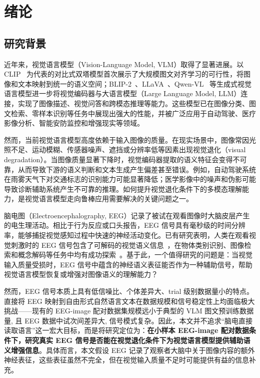 \section{绪论}

\subsection{研究背景}

近年来，视觉语言模型（Vision-Language Model, VLM）取得了显著进展。以 CLIP~\cite{radford2021learning} 为代表的对比式双塔模型首次展示了大规模图文对齐学习的可行性，将图像和文本映射到统一的语义空间；BLIP-2~\cite{li2023blip2}、LLaVA~\cite{liu2024llava}、Qwen-VL~\cite{bai2023qwen} 等生成式视觉语言模型进一步将视觉编码器与大语言模型（Large Language Model, LLM）连接，实现了图像描述、视觉问答和跨模态推理等能力。这些模型已在图像分类、图文检索、零样本识别等任务中展现出强大的性能，并被广泛应用于自动驾驶、医疗影像分析、智能安防监控和增强现实等领域。

然而，当前视觉语言模型高度依赖于输入图像的质量。在现实场景中，图像常因光照不足、运动模糊、传感器噪声、遮挡或分辨率低等因素出现视觉退化（visual degradation）。当图像质量显著下降时，视觉编码器提取的语义特征会变得不可靠，从而导致下游的语义判断和文本生成产生偏差甚至错误。例如，自动驾驶系统在雨雾天气下对交通标志的识别能力可能显著降低；医学影像中的噪声和伪影可能导致诊断辅助系统产生不可靠的推理。如何提升视觉退化条件下的多模态理解能力，是视觉语言模型走向鲁棒应用需要解决的关键问题之一。

脑电图（Electroencephalography, EEG）记录了被试在观看图像时大脑皮层产生的电生理活动。相比于行为反应或口头报告，EEG 信号具有毫秒级的时间分辨率，能够捕捉视觉感知过程中快速的神经活动变化。已有研究表明，人类在观看视觉刺激时的 EEG 信号包含了可解码的视觉语义信息~\cite{gifford2023alanet}，在物体类别识别、图像检索和概念解码等任务中均有成功探索~\cite{spampinato2017deep,kavasidis2017spatio}。基于此，一个值得研究的问题是：当视觉输入质量受损时，EEG 信号中蕴含的神经语义表征能否作为一种辅助信号，帮助视觉语言模型恢复或增强对图像语义的理解能力？

然而，EEG 信号本质上具有低信噪比、个体差异大、trial 级别数据量小的特点。直接将 EEG 映射到自由形式自然语言文本在数据规模和信号稳定性上均面临极大挑战——现有的 EEG-image 配对数据集规模远小于典型的 VLM 图文预训练数据量, 且 EEG 数据中试次间差异大, 信号模式复杂。因此，本文并不追求``脑电直接读取语言''这一宏大目标，而是将研究定位为：\textbf{在小样本 EEG-image 配对数据条件下，研究真实 EEG 信号是否能在视觉退化条件下为视觉语言模型提供辅助语义增强信息}。具体而言，本文假设 EEG 记录了观察者大脑中关于图像内容的额外神经表征，这些表征虽然不完全，但在视觉输入质量不足时可能提供有益的信息补充。

